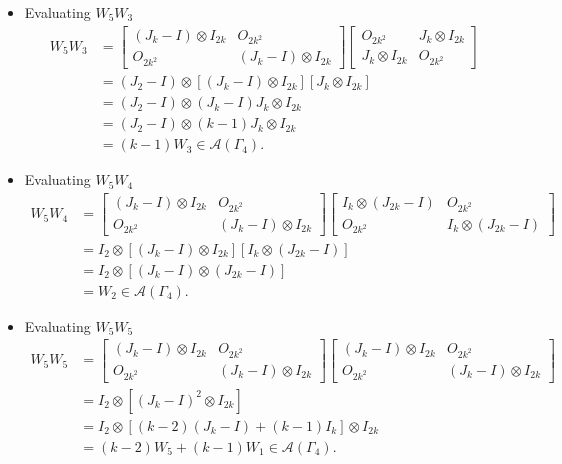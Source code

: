 \begin{itemize}
    \item Evaluating \( W_5 W_3 \)
    \begin{align*}
        W_5 W_3
        &=\begin{bmatrix}
            (J_k-I)\otimes I_{2k} & O_{2k^2} \\
            O_{2k^2} & (J_k-I)\otimes I_{2k}
        \end{bmatrix}\begin{bmatrix}
            O_{2k^2} & J_k \otimes I_{2k} \\
            J_k \otimes I_{2k} & O_{2k^2}
        \end{bmatrix}\\
        &= (J_2-I)\otimes [(J_k-I)\otimes I_{2k}][J_k \otimes I_{2k}]\\
        &= (J_2-I)\otimes (J_k-I)J_k\otimes I_{2k}\\
        &= (J_2-I)\otimes (k-1)J_k\otimes I_{2k}\\
        &= (k-1)W_3\in\mathcal{A}(\Gamma_4).
    \end{align*}
    
    \item Evaluating \( W_5 W_4 \)
    \begin{align*}
        W_5 W_4
        &=\begin{bmatrix}
            (J_k-I)\otimes I_{2k} & O_{2k^2} \\
            O_{2k^2} & (J_k-I)\otimes I_{2k}
        \end{bmatrix}\begin{bmatrix}
            I_k \otimes (J_{2k} -I) & O_{2k^2}\\
            O_{2k^2} & I_k \otimes (J_{2k} -I)
        \end{bmatrix} \\
        &= I_2\otimes [(J_k-I)\otimes I_{2k}][I_k \otimes (J_{2k} -I)]\\
        &= I_2\otimes [(J_k-I)\otimes (J_{2k}-I)]\\
        &=W_2\in\mathcal{A}(\Gamma_4).
    \end{align*}
    
    \item Evaluating \( W_5 W_5 \)
    \begin{align*}
        W_5 W_5
        &=\begin{bmatrix}
            (J_k-I)\otimes I_{2k} & O_{2k^2} \\
            O_{2k^2} & (J_k-I)\otimes I_{2k}
        \end{bmatrix}\begin{bmatrix}
            (J_k-I)\otimes I_{2k} & O_{2k^2} \\
            O_{2k^2} & (J_k-I)\otimes I_{2k}
        \end{bmatrix} \\
        &= I_2\otimes [(J_k-I)^2\otimes I_{2k}] \\
        &= I_2\otimes [(k-2)(J_k-I) + (k-1)I_k] \otimes I_{2k}\\
        &= (k-2)W_5 + (k-1)W_1\in\mathcal{A}(\Gamma_4).
    \end{align*}
    

\end{itemize}
